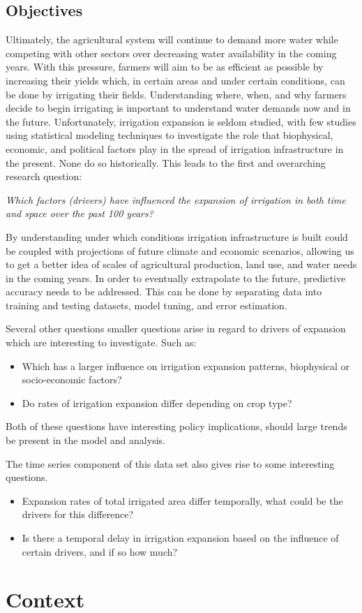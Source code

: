 \documentclass[12pt,twoside]{reedthesis}
\begin{document}
\hypertarget{objectives}{%
\section{Objectives}\label{objectives}}

Ultimately, the agricultural system will continue to demand more water while competing with other sectors over decreasing water availability in the coming years. With this pressure, farmers will aim to be as efficient as possible by increasing their yields which, in certain areas and under certain conditions, can be done by irrigating their fields. Understanding where, when, and why farmers decide to begin irrigating is important to understand water demands now and in the future. Unfortunately, irrigation expansion is seldom studied, with few studies using statistical modeling techniques to investigate the role that biophysical, economic, and political factors play in the spread of irrigation infrastructure in the present. None do so historically. This leads to the first and overarching research question:

\emph{Which factors (drivers) have influenced the expansion of irrigation in both time and space over the past 100 years?}

By understanding under which conditions irrigation infrastructure is built could be coupled with projections of future climate and economic scenarios, allowing us to get a better idea of scales of agricultural production, land use, and water needs in the coming years. In order to eventually extrapolate to the future, predictive accuracy needs to be addressed. This can be done by separating data into training and testing datasets, model tuning, and error estimation.

Several other questions smaller questions arise in regard to drivers of expansion which are interesting to investigate. Such as:
\begin{itemize}
\item
  Which has a larger influence on irrigation expansion patterns, biophysical or socio-economic factors?
\item
  Do rates of irrigation expansion differ depending on crop type?
\end{itemize}
Both of these questions have interesting policy implications, should large trends be present in the model and analysis.

The time series component of this data set also gives rise to some interesting questions.
\begin{itemize}
\item
  Expansion rates of total irrigated area differ temporally, what could be the drivers for this difference?
\item
  Is there a temporal delay in irrigation expansion based on the influence of certain drivers, and if so how much?
\end{itemize}
\hypertarget{Theory}{%
\chapter{Context}\label{Theory}}
\end{document}
